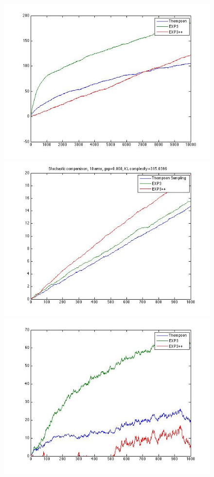 \documentclass[10.5pt]{article}
\begin{document}
\begin{figure}[H]
  \includegraphics[width=\linewidth]{comparaison_contamined.jpg}
  \label{fig:awesome_image1}
\endminipage\hfill
{}
  \includegraphics[width=\linewidth]{stochasticComparaison.jpg}
  \label{fig:awesome_image2}
\endminipage\hfill
{}%
  \includegraphics[width=\linewidth]{compAdversarial.jpg}

\end{figure}
\end{document}
